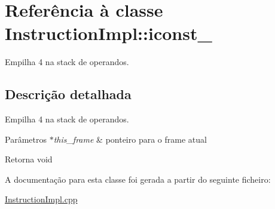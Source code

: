 \hypertarget{class_instruction_impl_1_1iconst__4}{}\section{Referência à classe Instruction\+Impl\+:\+:iconst\+\_}
\label{class_instruction_impl_1_1iconst__4}


Empilha 4 na stack de operandos.  




\subsection{Descrição detalhada}
Empilha 4 na stack de operandos. 


\begin{DoxyParams}{Parâmetros}
{\em $\ast$this\+\_\+frame} & ponteiro para o frame atual \\
\hline
\end{DoxyParams}
\begin{DoxyReturn}{Retorna}
void 
\end{DoxyReturn}


A documentação para esta classe foi gerada a partir do seguinte ficheiro\+:\begin{DoxyCompactItemize}
\item 
\hyperlink{_instruction_impl_8cpp}{Instruction\+Impl.\+cpp}\end{DoxyCompactItemize}
